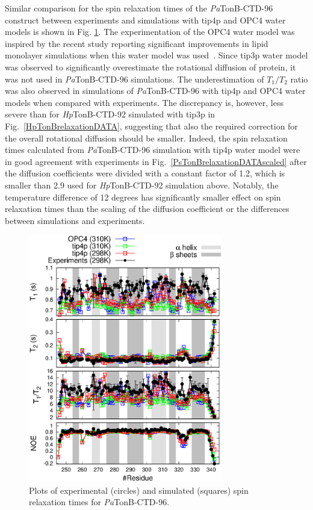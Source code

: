 \documentclass[journal=jpcbfk,manuscript=article]{achemso}
\begin{document}
Similar comparison for the spin relaxation times of the {\it Pa}TonB-CTD-96 construct
between experiments and simulations with tip4p and OPC4 water models
is shown in Fig. \ref{PsTonBrelaxationDATA}.
The experimentation of the OPC4 water model was inspired by the
recent study reporting significant improvements in lipid monolayer
simulations when this water model was used~\cite{javanainen17}. 
Since tip3p water model was observed to significantly overestimate the
rotational diffusion of protein, it was not used in {\it Pa}TonB-CTD-96
simulations. The underestimation of $T_1/T_2$ ratio was 
also observed in simulations of {\it Pa}TonB-CTD-96 with
tip4p and OPC4 water models when compared with experiments.
The discrepancy is, however, less severe than for {\it Hp}TonB-CTD-92 simulated
with tip3p in Fig.~\ref{HpTonBrelaxationDATA}, suggesting that also
the required correction for the overall rotational diffusion should
be smaller. Indeed,
the spin relaxation times calculated
from {\it Pa}TonB-CTD-96 simulation with tip4p water model
were in good agreement with experiments in Fig.~\ref{PsTonBrelaxationDATAscaled}
after the diffusion coefficients were divided with a constant factor of 1.2,
which is smaller than 2.9 used for {\it Hp}TonB-CTD-92 simulation above.
Notably, the temperature difference of 12 degrees has significantly 
smaller effect on spin relaxation times than the scaling of the diffusion 
coefficient or the differences between simulations and experiments.
\begin{figure}[tb]
  \includegraphics[width=8.5cm]{../Figs/PsTonBrelaxationDATA.eps}%
  \caption{Plots of experimental (circles) and simulated (squares) spin relaxation times
    for {\it Pa}TonB-CTD-96. \label{PsTonBrelaxationDATA}}%
\end{figure}
\end{document}
